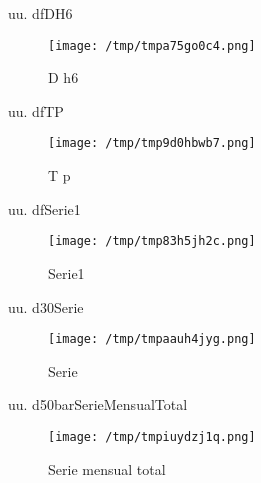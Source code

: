 \documentclass[a4paper,10pt,twocolumn]{article}
\begin{document}
\begin{Form}
uu. dfDH6

\begin{figure}[H] \centering
                    
                    \texttt{[image: /tmp/tmpa75go0c4.png]}
                    \caption{D h6}
                    
                    \label{fig:dfassssdfsa}
                    \end{figure}
                    

uu. dfTP

\begin{figure}[H] \centering
                    
                    \texttt{[image: /tmp/tmp9d0hbwb7.png]}
                    \caption{T p}
                    
                    \label{fig:dfassssdfsa}
                    \end{figure}
                    

uu. dfSerie1

\begin{figure}[H] \centering
                    
                    \texttt{[image: /tmp/tmp83h5jh2c.png]}
                    \caption{Serie1}
                    
                    \label{fig:dfassssdfsa}
                    \end{figure}
                    

uu. d30Serie

\begin{figure}[H] \centering
                    
                    \texttt{[image: /tmp/tmpaauh4jyg.png]}
                    \caption{Serie}
                    
                    \label{fig:dfassssdfsa}
                    \end{figure}
                    

uu. d50barSerieMensualTotal

\begin{figure}[H] \centering
                    
                    \texttt{[image: /tmp/tmpiuydzj1q.png]}
                    \caption{Serie mensual total}
                    
                    \label{fig:dfassssdfsa}
                    \end{figure}
                    


\end{Form}
\end{document}

